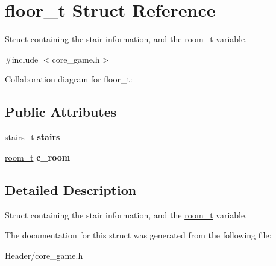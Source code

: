 \hypertarget{structfloor__t}{}\section{floor\+\_\+t Struct Reference}
\label{structfloor__t}


Struct containing the stair information, and the \hyperlink{structroom__t}{room\+\_\+t} variable.  




{\ttfamily \#include $<$core\+\_\+game.\+h$>$}



Collaboration diagram for floor\+\_\+t\+:
\subsection*{Public Attributes}
\begin{DoxyCompactItemize}
\item 
\mbox{\label{structfloor__t_aa1b1ee2e5843a8df2eae0acc77688b44}} 
\hyperlink{structstairs__t}{stairs\+\_\+t} {\bfseries stairs}
\item 
\mbox{\label{structfloor__t_a220c20fc86fbd5aa90143c893f31393c}} 
\hyperlink{structroom__t}{room\+\_\+t} {\bfseries c\+\_\+room}
\end{DoxyCompactItemize}


\subsection{Detailed Description}
Struct containing the stair information, and the \hyperlink{structroom__t}{room\+\_\+t} variable. 

The documentation for this struct was generated from the following file\+:\begin{DoxyCompactItemize}
\item 
Header/core\+\_\+game.\+h\end{DoxyCompactItemize}
